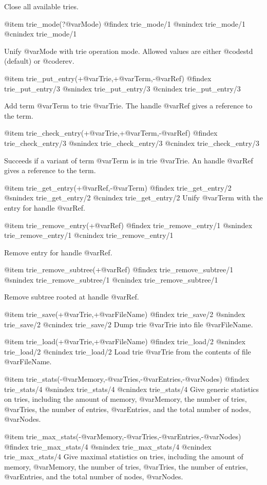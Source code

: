 {{{{{{{{Close all available tries.

@item trie_mode(?@var{Mode})
@findex trie_mode/1
@snindex trie_mode/1
@cnindex trie_mode/1

Unify @var{Mode} with trie operation mode. Allowed values are either
@code{std} (default) or @code{rev}.

@item trie_put_entry(+@var{Trie},+@var{Term},-@var{Ref})
@findex trie_put_entry/3
@snindex trie_put_entry/3
@cnindex trie_put_entry/3

Add term @var{Term} to trie @var{Trie}. The handle @var{Ref} gives
a reference to the term.

@item trie_check_entry(+@var{Trie},+@var{Term},-@var{Ref})
@findex trie_check_entry/3
@snindex trie_check_entry/3
@cnindex trie_check_entry/3

Succeeds if a variant of term @var{Term} is in trie @var{Trie}. An handle
 @var{Ref} gives a reference to the term.

@item trie_get_entry(+@var{Ref},-@var{Term})
@findex trie_get_entry/2
@snindex trie_get_entry/2
@cnindex trie_get_entry/2
Unify @var{Term} with the entry for handle @var{Ref}.

@item trie_remove_entry(+@var{Ref})
@findex trie_remove_entry/1
@snindex trie_remove_entry/1
@cnindex trie_remove_entry/1

Remove entry for handle @var{Ref}.

@item trie_remove_subtree(+@var{Ref})
@findex trie_remove_subtree/1
@snindex trie_remove_subtree/1
@cnindex trie_remove_subtree/1

Remove subtree rooted at handle @var{Ref}.

@item trie_save(+@var{Trie},+@var{FileName})
@findex trie_save/2
@snindex trie_save/2
@cnindex trie_save/2
Dump trie @var{Trie} into file @var{FileName}.


@item trie_load(+@var{Trie},+@var{FileName})
@findex trie_load/2
@snindex trie_load/2
@cnindex trie_load/2
Load trie @var{Trie} from the contents of file @var{FileName}.

@item trie_stats(-@var{Memory},-@var{Tries},-@var{Entries},-@var{Nodes})
@findex trie_stats/4
@snindex trie_stats/4
@cnindex trie_stats/4
Give generic statistics on tries, including the amount of memory,
@var{Memory}, the number of tries, @var{Tries}, the number of entries,
@var{Entries}, and the total number of nodes, @var{Nodes}.

@item trie_max_stats(-@var{Memory},-@var{Tries},-@var{Entries},-@var{Nodes})
@findex trie_max_stats/4
@snindex trie_max_stats/4
@cnindex trie_max_stats/4
Give maximal statistics on tries, including the amount of memory,
@var{Memory}, the number of tries, @var{Tries}, the number of entries,
@var{Entries}, and the total number of nodes, @var{Nodes}.


}}}}}}}}
